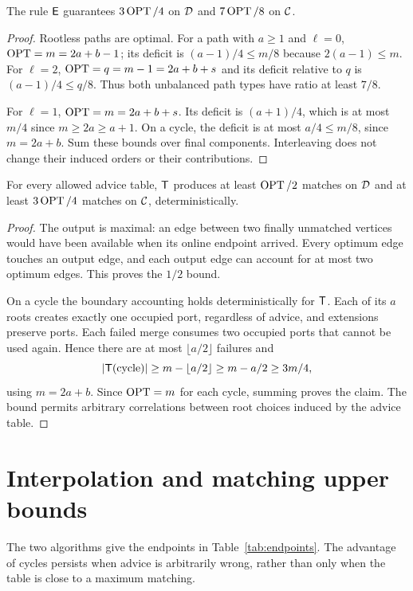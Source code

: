 \begin{corollary}\label{cor:fair}
The rule $\mathsf{E}$ guarantees $3\operatorname{OPT}/4$ on $\mathcal D$ and $7\operatorname{OPT}/8$ on $\mathcal C$.
\end{corollary}
\begin{proof}
Rootless paths are optimal. For a path with $a\ge1$ and $\ell=0$,
$\operatorname{OPT}=m=2a+b-1$; its deficit is $(a-1)/4\le m/8$ because
$2(a-1)\le m$. For $\ell=2$, $\operatorname{OPT}=q=m-1=2a+b+s$ and its deficit
relative to $q$ is $(a-1)/4\le q/8$. Thus both unbalanced path types
have ratio at least $7/8$.

For $\ell=1$, $\operatorname{OPT}=m=2a+b+s$. Its deficit is $(a+1)/4$, which is
at most $m/4$ since $m\ge2a\ge a+1$. On a cycle, the deficit is at most
$a/4\le m/8$, since $m=2a+b$. Sum these bounds over final components.
Interleaving does not change their induced orders or their contributions.
\end{proof}

\begin{lemma}\label{lem:robust}
For every allowed advice table, $\mathsf{T}$ produces at least $\operatorname{OPT}/2$ matches
on $\mathcal D$ and at least $3\operatorname{OPT}/4$ matches on $\mathcal C$, deterministically.
\end{lemma}
\begin{proof}
The output is maximal: an edge between two finally unmatched vertices
would have been available when its online endpoint arrived. Every optimum
edge touches an output edge, and each output edge can account for at most
two optimum edges. This proves the $1/2$ bound.

On a cycle the boundary accounting holds deterministically for $\mathsf{T}$.
Each of its $a$ roots creates exactly one occupied port, regardless of
advice, and extensions preserve ports. Each failed merge consumes two
occupied ports that cannot be used again. Hence there are at most
$\lfloor a/2\rfloor$ failures and
\[
 |\mathsf{T}(\text{cycle})|\ge m-\lfloor a/2\rfloor
 \ge m-a/2\ge3m/4,
\]
using $m=2a+b$. Since $\operatorname{OPT}=m$ for each cycle, summing proves the claim.
The bound permits arbitrary correlations between root choices induced by
the advice table.
\end{proof}

\section{Interpolation and matching upper bounds}
The two algorithms give the endpoints in Table~\ref{tab:endpoints}.
The advantage of cycles persists when advice is arbitrarily wrong, rather
than only when the table is close to a maximum matching.

